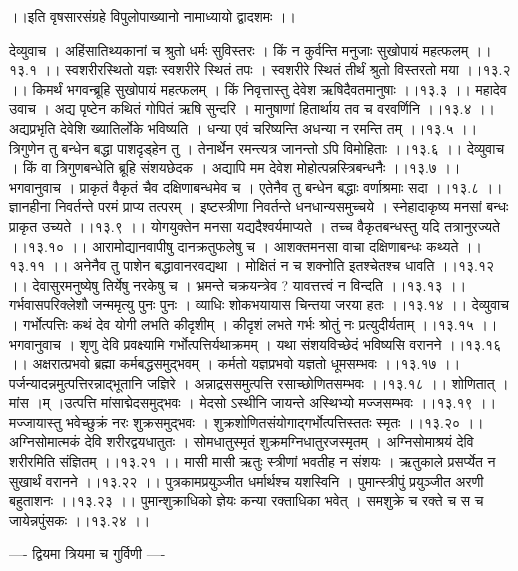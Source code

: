\documentclass[11pt]{book}
\begin{document}
\begin{landscape}
 ।।इति वृषसारसंग्रहे विपुलोपाख्यानो नामाध्यायो द्वादशमः ।।




देव्युवाच ।
अहिंसातिथ्यकानां च श्रुतो धर्मः सुविस्तरः ।
किं न कुर्वन्ति मनुजाः सुखोपायं महत्फलम् ।।१३.१ ।।
स्वशरीरस्थितो यज्ञः स्वशरीरे स्थितं तपः ।
स्वशरीरे स्थितं तीर्थं श्रुतो विस्तरतो मया ।।१३.२ ।।
किमर्थं भगवन्ब्रूहि सुखोपायं महत्फलम् ।
किं निवृत्तास्तु देवेश ऋषिदैवतमानुषाः ।।१३.३ ।।
महादेव उवाच ।
अद्य पृष्टेन कथितं गोपितं ऋषि सुन्दरि ।
मानुषाणां हितार्थाय तव च वरवर्णिनि ।।१३.४ ।।
अद्यप्रभृति देवेशि ख्यातिर्लोके भविष्यति ।
धन्या एवं चरिष्यन्ति अधन्या न रमन्ति तम् ।।१३.५ ।।
त्रिगुणेन तु बन्धेन बद्धा पाशदृड्हेन तु ।
तेनार्थेन रमन्त्यत्र जानन्तो ऽपि विमोहिताः ।।१३.६ ।।
देव्युवाच ।
किं वा त्रिगुणबन्धेति ब्रूहि संशयछेदक ।
अद्यापि मम देवेश मोहोत्पन्नस्त्रिबन्धनैः ।।१३.७ ।।
भगवानुवाच ।
प्राकृतं वैकृतं चैव दक्षिणाबन्धमेव च ।
एतेनैव तु बन्धेन बद्धाः वर्णाश्रमाः सदा ।।१३.८ ।।
ज्ञानहीना निवर्तन्ते परमं प्राप्य तत्परम् ।
इष्टस्त्रीणा निवर्तन्ते धनधान्यसमुच्चये ।
स्नेहादाकृष्य मनसां बन्धः प्राकृत उच्यते ।।१३.९ ।।
योगयुक्तेन मनसा यद्यदैश्वर्यमाप्यते ।
तच्च वैकृतबन्धस्तु यदि तत्रानुरज्यते ।।१३.१० ।।
आरामोद्यानवापीषु दानक्रतुफलेषु च ।
आशक्तमनसा वाचा दक्षिणाबन्धः कथ्यते ।।१३.११ ।।
अनेनैव तु पाशेन बद्धावानरवद्यथा ।
मोक्षितं न च शक्नोति इतश्चेतश्च धावति ।।१३.१२ ।।
देवासुरमनुष्येषु तिर्येषु नरकेषु च ।
भ्रमन्ते चक्रयन्त्रेव ? यावत्तत्त्वं न विन्दति ।।१३.१३ ।।
गर्भवासपरिक्लेशौ जन्ममृत्यु पुनः पुनः ।
व्याधिः शोकभयायास चिन्तया जरया हतः ।।१३.१४ ।।
देव्युवाच ।
गर्भोत्पत्तिः कथं देव योगी लभति कीदृशीम् ।
कीदृशं लभते गर्भः श्रोतुं नः प्रत्युदीर्यताम् ।।१३.१५ ।।
भगवानुवाच ।
शृणु देवि प्रवक्ष्यामि गर्भोत्पत्तिर्यथाक्रमम् ।
यथा संशयविच्छेदं भविष्यसि वरानने ।।१३.१६ ।।
अक्षरात्प्रभवो ब्रह्मा कर्मबद्धसमुद्भवम् ।
कर्मतो यज्ञप्रभवो यज्ञतो धूमसम्भवः ।।१३.१७ ।।
पर्जन्यादन्नमुत्पत्तिरन्नाद्भूतानि जज्ञिरे ।
अन्नाद्रससमुत्पत्ति रसाच्छोणितसम्भवः ।।१३.१८ ।।
शोणितात्  । मांस ।म् ।उत्पत्ति मांसाद्मेदसमुद्भवः ।
मेदसो ऽस्थीनि जायन्ते अस्थिभ्यो मज्जसम्भवः ।।१३.१९ ।।
मज्जायास्तु भवेच्छुक्रं नरः शुक्रसमुद्भवः ।
शुक्रशोणितसंयोगाद्गर्भोत्पत्तिस्ततः स्मृतः ।।१३.२० ।।
अग्निसोमात्मकं देवि शरीरद्वयधातुतः ।
सोमधातुस्मृतं शुक्रमग्निधातुरजस्मृतम् ।
अग्निसोमाश्रयं देवि शरीरमिति संज्ञितम् ।।१३.२१ ।।
मासी मासी ऋतुः स्त्रीणां भवतीह न संशयः ।
ऋतुकाले प्रसर्प्येत न सुखार्थं वरानने ।।१३.२२ ।।
पुत्रकामप्रयुञ्जीत धर्मार्थश्च यशस्विनि ।
पुमान्स्त्रीपुं प्रयुञ्जीत अरणी बहुताशनः ।।१३.२३ ।।
पुमान्शुक्राधिको ज्ञेयः कन्या रक्ताधिका भवेत् ।
समशुक्रे च रक्ते च स च जायेन्नपुंसकः ।।१३.२४ ।।

---- द्वियमा त्रियमा च गुर्विणी ----


\end{landscape}
\end{document}
